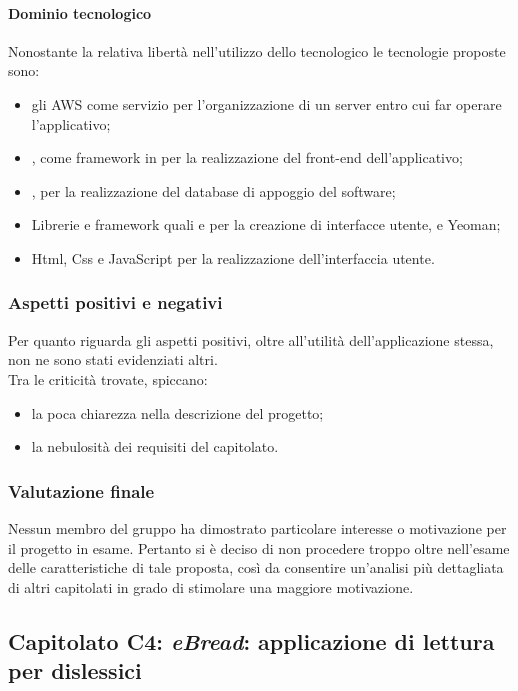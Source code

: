			\paragraph{Dominio tecnologico}
			Nonostante la relativa libertà nell'utilizzo dello  tecnologico le tecnologie proposte sono:
			\begin{itemize}
				\item gli AWS come servizio per l'organizzazione di un server entro cui far operare l'applicativo;
				\item {}, come framework in  per la realizzazione del front-end dell'applicativo;
				\item {}, per la realizzazione del database di appoggio del software;
				\item Librerie e framework quali  e  per la creazione di interfacce utente,  e Yeoman;
				\item Html, Css e JavaScript per la realizzazione dell'interfaccia utente.
			\end{itemize}
		\subsubsection{Aspetti positivi e negativi}
		Per quanto riguarda gli aspetti positivi, oltre all'utilità dell'applicazione stessa, non ne sono stati evidenziati altri.
		\\Tra le criticità trovate, spiccano:
		\begin{itemize}
			\item la poca chiarezza nella descrizione del progetto;
			\item la nebulosità dei requisiti del capitolato.
		\end{itemize}
		\subsubsection{Valutazione finale}
		Nessun membro del gruppo ha dimostrato particolare interesse o motivazione per il progetto in esame. Pertanto si è deciso di non procedere 
		troppo oltre nell'esame delle caratteristiche di tale proposta, così da consentire un'analisi più dettagliata di altri capitolati in grado 
		di stimolare una maggiore motivazione.
		
	\subsection{Capitolato C4: \emph{eBread}: applicazione di lettura per dislessici}
